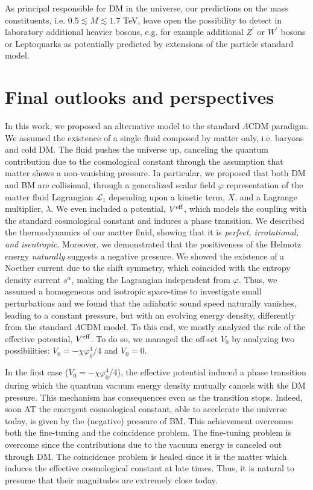 \documentclass[twocolumn,showpacs, nofootinbib,aps,superscriptaddress, eqsecnum,prd,prl,notitlepage,showkeys,10pt,reprint]{revtex4-1}
\begin{document}
As principal responsible for DM in the universe, our predictions on the mass constituents, i.e. $0.5\lesssim M\lesssim1.7$ TeV, leave open the possibility to detect in laboratory additional heavier bosons, e.g. for example additional $Z^\prime$ or $W^\prime$ bosons or Leptoquarks as potentially predicted by extensions of the particle standard model.






\section{Final outlooks and perspectives}
\label{conclusions}

In this work, we proposed an alternative model to the standard $\Lambda$CDM paradigm. We assumed the existence of a single fluid composed by matter only, i.e. baryons and cold DM. The fluid pushes the universe up, canceling the quantum contribution due to the cosmological constant through the assumption that matter shows a non-vanishing pressure. In particular, we proposed that both DM and BM are collisional, through a generalized scalar field $\varphi$  representation of the matter fluid Lagrangian $\mathcal{L}_1$ depending upon a kinetic term, $X$, and a Lagrange multiplier, $\lambda$.
We even included a potential, $V^{\rm eff}$, which models the coupling with the standard cosmological constant and induces a phase transition. We described the thermodynamics of our matter fluid, showing that it is \emph{perfect, irrotational, and isentropic}. Moreover, we demonstrated that the positiveness of the Helmotz energy \emph{naturally} suggests a negative pressure.
We showed the existence of a Noether current due to the shift symmetry, which coincided with the entropy density current $s^\alpha$, making the Lagrangian independent from $\varphi$. Thus,  we assumed a homogeneous and isotropic space-time to investigate small perturbations and we found that the adiabatic sound speed naturally vanishes, leading to a constant pressure, but with an evolving energy density, differently from the standard $\Lambda$CDM model. To this end, we mostly analyzed the role of the effective potential, $V^{\rm eff}$. To do so, we managed the off-set $V_0$ by analyzing two possibilities: $V_0= -\chi\varphi_0^4/4$ and $V_0=0$.

In the first case ($V_0= -\chi\varphi_0^4/4$), the effective potential induced a phase transition during which the quantum vacuum energy density mutually cancels with the DM pressure. This mechanism has consequences even as the transition stops. Indeed, soon AT the emergent cosmological constant, able to accelerate the universe today, is given by the (negative) pressure of BM. This achievement overcomes both the fine-tuning and the coincidence problem. The fine-tuning problem is overcome since the contributions due to the vacuum energy is canceled out through DM. The coincidence problem is healed since it is the matter which induces the effective cosmological constant at late times. Thus, it is natural to presume that their magnitudes are extremely close today.
\end{document}
